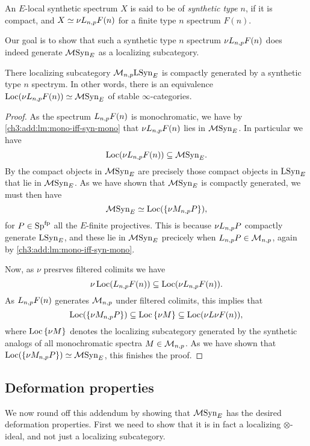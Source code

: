 \begin{definition}
    An $E$-local synthetic spectrum $X$ is said to be of \emph{synthetic type} $n$, if it is compact, and $X\simeq \nu L_{n,p} F(n)$ for a finite type $n$ spectrum $F(n)$. 
\end{definition}

Our goal is to show that such a synthetic type $n$ spectrum $\nu L_{n,p} F(n)$ does indeed generate $\mathcal{M}\mathrm{Syn}_{E}$ as a localizing subcategory. 

\begin{lemma}
    \label{ch3:add:monochromatic-synthetic-is-gen-by-type-n}
    There localizing subcategory $\mathcal{M}_{n,p}\mathrm{LSyn}_{E}$ is compactly generated by a synthetic type $n$ spectrym. In other words, there is an equivalence $\operatorname{Loc}(\nu L_{n,p} F(n))\simeq \mathcal{M}\mathrm{Syn}_{E}$ of stable $\infty$-categories. 
\end{lemma}
\begin{proof}
    As the spectrum $L_{n,p} F(n)$ is monochromatic, we have by \cref{ch3:add:lm:mono-iff-syn-mono} that $\nu L_{n,p} F(n)$ lies in $\mathcal{M}\mathrm{Syn}_{E}$. In particular we have 
    \[\operatorname{Loc}(\nu L_{n,p} F(n))\subseteq \mathcal{M}\mathrm{Syn}_{E}.\]
    By \cite[2.2]{neeman_1992} the compact objects in $\mathcal{M}\mathrm{Syn}_{E}$ are precisely those compact objects in $\mathrm{LSyn}_{E}$ that lie in $\mathcal{M}\mathrm{Syn}_{E}$. As we have shown that $\mathcal{M}\mathrm{Syn}_{E}$ is compactly generated, we must then have 
    \[\mathcal{M}\mathrm{Syn}_{E} \simeq \operatorname{Loc}(\{\nu M_{n,p} P\}),\]
    for $P \in \mathrm{Sp}^{\mathrm{fp}}$ all the $E$-finite projectives. This is because $\nu L_{n,p} P$ compactly generate $\mathrm{LSyn}_{E}$, and these lie in $\mathcal{M}\mathrm{Syn}_{E}$ precicely when $L_{n,p} P\in \mathcal{M}_{n,p}$, again by \cref{ch3:add:lm:mono-iff-syn-mono}. 

    Now, as $\nu$ presrves filtered colimits we have 
    \[\nu \operatorname{Loc}(L_{n,p} F(n))\subseteq \operatorname{Loc}(\nu L_{n,p} F(n)).\]
    As $L_{n,p} F(n)$ generates $\mathcal{M}_{n,p}$ under filtered colimits, this implies that 
    \[\operatorname{Loc}(\{\nu M_{n,p} P\})\subseteq \operatorname{Loc}{\{\nu M\}} \subseteq \operatorname{Loc}(\nu L\nu F(n)),\]
    where $\operatorname{Loc}{\{\nu M\}}$ denotes the localizing subcategory generated by the synthetic analogs of all monochromatic spectra $M\in \mathcal{M}_{n,p}$. As we have shown that $\operatorname{Loc}(\{\nu M_{n,p} P\})\simeq \mathcal{M}\mathrm{Syn}_{E}$, this finishes the proof. 
\end{proof}



\subsection{Deformation properties}

We now round off this addendum by showing that $\mathcal{M}\mathrm{Syn}_{E}$ has the desired deformation properties. First we need to show that it is in fact a localizing $\otimes$-ideal, and not just a localizing subcategory. 

